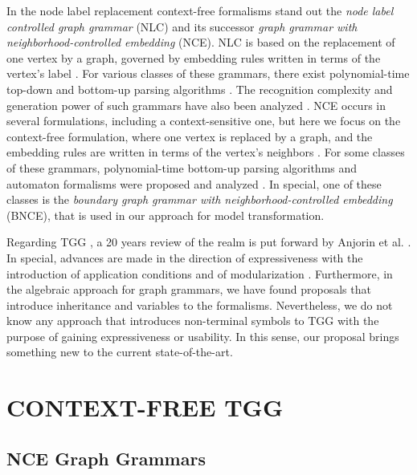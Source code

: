 \documentclass[a4paper,twoside]{article}
\begin{document}
In the node label replacement context-free formalisms stand out the \textit{node label controlled graph grammar} (NLC) and its successor \textit{graph grammar with neighborhood-controlled embedding} (NCE). NLC is based on the replacement of one vertex by a graph, governed by embedding rules written in terms of the vertex's label \cite{rozenberg1986boundary}. For various classes of these grammars, there exist polynomial-time top-down and bottom-up parsing algorithms \cite{flasinski1993parsing,flasinski2014characteristics,rozenberg1986boundary,wanke1991algorithms}. The recognition complexity and generation power of such grammars have also been analyzed \cite{flasinski1998power,kim2012structure}. NCE occurs in several formulations, including a context-sensitive one, but here we focus on the context-free formulation, where one vertex is replaced by a graph, and the embedding rules are written in terms of the vertex's neighbors \cite{janssens1982graph,skodinis1998neighborhood}. For some classes of these grammars, polynomial-time bottom-up parsing algorithms and automaton formalisms were proposed and analyzed \cite{kim2001efficient,brandenburg2005finite}. In special, one of these classes is the \textit{boundary graph grammar with neighborhood-controlled embedding} (BNCE), that is used in our approach for model transformation.

Regarding TGG \cite{schurr1994specification}, a 20 years review of the realm is put forward by Anjorin et al. \cite{anjorin201620}. In special, advances are made in the direction of expressiveness with the introduction of application conditions \cite{klar2010extended} and of modularization \cite{anjorin2014modularizing}. Furthermore, in the algebraic approach for graph grammars, we have found proposals that introduce inheritance \cite{bardohl2004integrating,hermann2008typed} and variables \cite{hoffmann2005graph} to the formalisms. Nevertheless, we do not know any approach that introduces non-terminal symbols to TGG with the purpose of gaining expressiveness or usability. In this sense, our proposal brings something new to the current state-of-the-art.

\section{\uppercase{Context-free TGG}}

\noindent

\subsection{NCE Graph Grammars}
\end{document}
